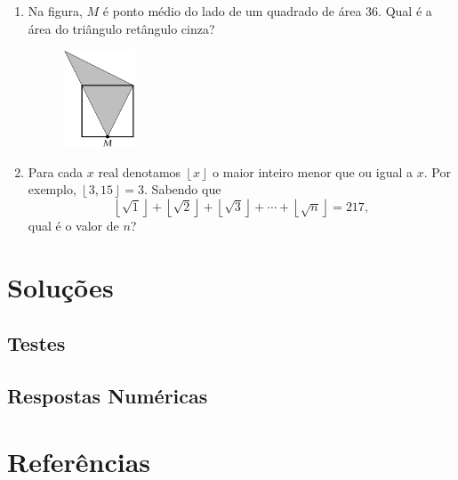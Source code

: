 \documentclass[12pt]{article}
\newcommand{\kb}[1]{\left\lfloor #1 \right\rfloor}
\begin{document}
\begin{enumerate}[label=\textbf{\arabic*.}]
      \item Na figura, $M$ é ponto médio do lado de um quadrado de área $36$. Qual é a área do triângulo retângulo cinza? \\
        \begin{figure}[h]
          \centering
          \includegraphics[width=0.2\textwidth]{fifth.png}
        \end{figure}

      \item Para cada $x$ real denotamos $\kb{x}$ o maior inteiro menor que ou igual a $x$. Por exemplo, $\kb{3{,}15}=3$. Sabendo que
        \[
          \kb{\sqrt{1}}+\kb{\sqrt{2}}+\kb{\sqrt{3}}+\cdots+\kb{\sqrt{n}}=217,
        \]
        qual é o valor de $n$? \\

      \end{enumerate}

  \clearpage

  \section{\textsf{Soluções}}
    \subsection{Testes}
    \subsection{Respostas Numéricas}

  \clearpage

  \section{\textsf{Referências}}
\end{document}
